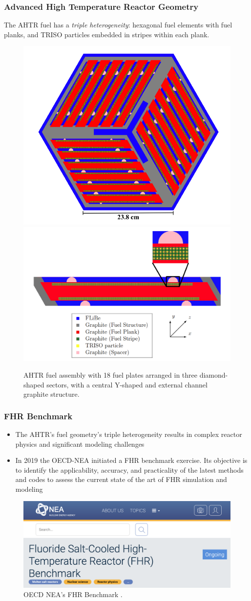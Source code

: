 \begin{frame}
  \frametitle{Advanced High Temperature Reactor Geometry}
  The AHTR fuel has a \emph{triple heterogeneity}: hexagonal fuel elements with 
  fuel planks, and TRISO particles embedded in stripes within each plank.
  \begin{figure}[]
    \includegraphics[width=0.5\linewidth]{figures/ahtr-assembly.png} 
    \includegraphics[width=0.5\linewidth]{figures/ahtr-plank.png} 
    \caption{AHTR fuel assembly with 18 fuel plates arranged in 
    three diamond-shaped sectors, with a central Y-shaped and external channel 
    graphite structure.}
\end{figure}
\end{frame}

\begin{frame}
  \frametitle{FHR Benchmark}
  \begin{itemize}
    \item The AHTR's fuel geometry's triple heterogeneity results in
    complex reactor physics and significant modeling challenges
    \item In 2019 the OECD-NEA initiated a FHR benchmark exercise. Its objective 
    is to identify the applicability, accuracy, and practicality of the latest 
    methods and codes to assess the current state of the art of FHR simulation 
    and modeling
  \end{itemize}
  \begin{figure}[]
    \includegraphics[width=0.7\linewidth]{figures/benchmark.png} 
    \caption{OECD NEA's FHR Benchmark \cite{petrovic_benchmark_2021}.}
\end{figure}
\end{frame}
